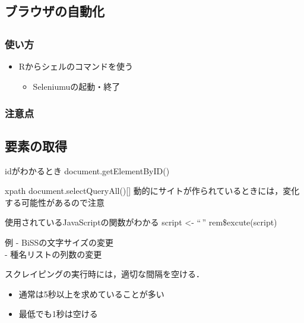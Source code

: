 \documentclass[
]{article}
\providecommand{\tightlist}{%
  \setlength{\itemsep}{0pt}\setlength{\parskip}{0pt}}
\begin{document}
\hypertarget{ux30d6ux30e9ux30a6ux30b6ux306eux81eaux52d5ux5316}{%
\subsection{ブラウザの自動化}\label{ux30d6ux30e9ux30a6ux30b6ux306eux81eaux52d5ux5316}}

\hypertarget{section}{%
\subsection{}\label{section}}

\hypertarget{ux4f7fux3044ux65b9}{%
\subsubsection{使い方}\label{ux4f7fux3044ux65b9}}

\begin{itemize}
\tightlist
\item
  Rからシェルのコマンドを使う

  \begin{itemize}
  \tightlist
  \item
    Seleniumuの起動・終了
  \end{itemize}
\end{itemize}

\hypertarget{ux6ce8ux610fux70b9}{%
\subsubsection{注意点}\label{ux6ce8ux610fux70b9}}

\hypertarget{ux8981ux7d20ux306eux53d6ux5f97}{%
\subsection{要素の取得}\label{ux8981ux7d20ux306eux53d6ux5f97}}

idがわかるとき
document.getElementByID()

xpath
document.selectQueryAll(){[}{]}
動的にサイトが作られているときには，変化する可能性があるので注意

使用されているJavaScriptの関数がわかる
script \textless- ``\,''
rem\$excute(script)

例
- BiSSの文字サイズの変更\\
- 種名リストの列数の変更

スクレイピングの実行時には，適切な間隔を空ける．

\begin{itemize}
\tightlist
\item
  通常は5秒以上を求めていることが多い\\
\item
  最低でも1秒は空ける
\end{itemize}
\end{document}
